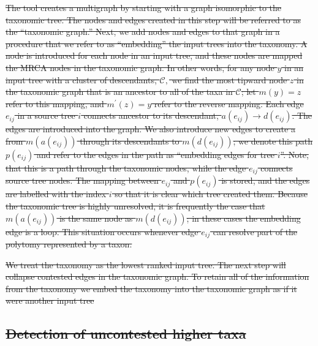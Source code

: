 \documentclass[fleqn,12pt,lineno,english]{wlpeerj}
\providecommand{\DIFdeltex}[1]{{\protect\color{red}\sout{#1}}}                      %
\providecommand{\DIFdel}[1]{\texorpdfstring{\DIFdeltex{#1}}{}} %
\begin{document}
\DIFdel{The tool creates a multigraph by starting with a graph isomorphic
to the taxonomic tree. The nodes and edges created in this step will
be referred to as the ``taxonomic graph.'' Next, we add nodes and
edges to that graph in a procedure that we refer to as ``embedding''
the input trees into the taxonomy. A node is introduced for each node
in an input tree, and these nodes are mapped the MRCA nodes in the
taxonomic graph. In other words, for any node $y$ in an input tree
with a cluster of descendants, $\mathcal{C},$ we find the most tipward
node $z$ in the taxonomic graph that is an ancestor to all of the
taxa in $\mathcal{C}$; let $m(y)=z$ refer to this mapping, and $m^{\prime}(z)=y$
refer to the reverse mapping. Each edge $e_{ij}$ in a source tree
$i$ connects ancestor to its descendant, $a(e_{ij})\rightarrow d(e_{ij})$.
The edges are introduced into the graph. We also introduce new edges
to create a from $m(a(e_{ij}))$ through its descendants to $m(d(e_{ij}))$;
we denote this path $p(e_{ij})$ and refer to the edges in the path
as ``embedding edges for tree $i$''. Note, that this is a path
through the taxonomic nodes, while the edge $e_{ij}$ connects source
tree nodes. The mapping between $e_{ij}$ and $p(e_{ij})$ is stored,
and the edges are labelled with the index $i$ so that it is clear
which tree created them. Because the taxonomic tree is highly unresolved,
it is frequently the case that $m(a(e_{ij}))$ is the same node as
$m(d(e_{ij}))$; in these cases the embedding edge is a loop. This
situation occurs whenever edge $e_{ij}$ can resolve part of the polytomy
represented by a taxon. 
}%

\DIFdel{We treat the taxonomy as the lowest ranked input tree. The next step
will collapse contested edges in the taxonomic graph. To retain all
of the information from the taxonomy we embed the taxonomy into the
taxonomic graph as if it were another input tree
}%

\subsection{\DIFdel{Detection of uncontested higher taxa}}
\addtocounter{subsection}{-1}%
\end{document}
